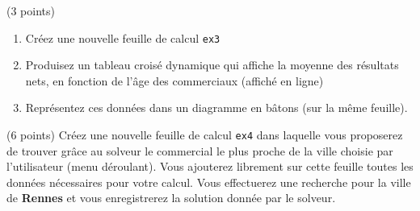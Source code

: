\documentclass[a4paper]{article}
\begin{document}
\exost (3 points)
\begin{enumerate}
 \item Cr\'eez une nouvelle feuille de calcul \verb?ex3?
 \item Produisez un tableau crois\'e dynamique qui affiche la moyenne des r\'esultats nets, en fonction de l'\^age des commerciaux (affich\'e en ligne) %
 \item Repr\'esentez ces donn\'ees dans un diagramme en b\^atons (sur la m\^eme feuille).  %
\end{enumerate}

\exost (6 points) Cr\'eez une nouvelle feuille de calcul \verb?ex4? dans laquelle vous proposerez de trouver gr\^ace au solveur le commercial
le plus proche de la ville choisie par l'utilisateur (menu d\'eroulant). Vous ajouterez librement sur cette feuille toutes les donn\'ees n\'ecessaires pour votre calcul.
Vous effectuerez une recherche pour la ville de \textbf{Rennes} et vous enregistrerez la solution donn\'ee par le solveur.
\end{document}
